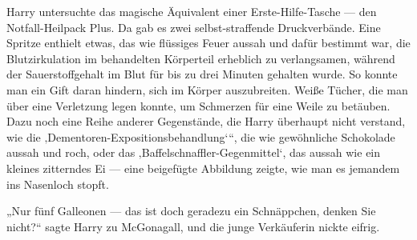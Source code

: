 Harry untersuchte das magische Äquivalent einer Erste-Hilfe-Tasche — den Notfall-Heilpack Plus. Da gab es zwei selbst-straffende Druckverbände. Eine Spritze enthielt etwas, das wie flüssiges Feuer aussah und dafür bestimmt war, die Blutzirkulation im behandelten Körperteil erheblich zu verlangsamen, während der Sauerstoffgehalt im Blut für bis zu drei Minuten gehalten wurde. So konnte man ein Gift daran hindern, sich im Körper auszubreiten. Weiße Tücher, die man über eine Verletzung legen konnte, um Schmerzen für eine Weile zu betäuben. Dazu noch eine Reihe anderer Gegenstände, die Harry überhaupt nicht verstand, wie die ‚Dementoren-Expositionsbehandlung‘“, die wie gewöhnliche Schokolade aussah und roch, oder das ‚Baffelschnaffler-Gegenmittel‘, das aussah wie ein kleines zitterndes Ei — eine beigefügte Abbildung zeigte, wie man es jemandem ins Nasenloch stopft.

„Nur fünf Galleonen — das ist doch geradezu ein Schnäppchen, denken Sie nicht?“ sagte Harry zu McGonagall, und die junge Verkäuferin nickte eifrig.

